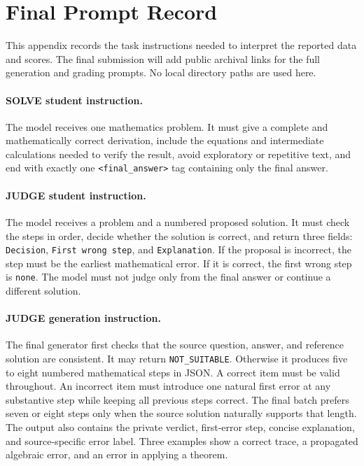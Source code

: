 \documentclass[11pt]{article}
\begin{document}
\clearpage
\section{Final Prompt Record}
\label{app:prompts}

This appendix records the task instructions needed to interpret the reported data and scores. The final submission will add public archival links for the full generation and grading prompts. No local directory paths are used here.

\paragraph{SOLVE student instruction.}
The model receives one mathematics problem. It must give a complete and mathematically correct derivation, include the equations and intermediate calculations needed to verify the result, avoid exploratory or repetitive text, and end with exactly one \texttt{<final\_answer>} tag containing only the final answer.

\paragraph{JUDGE student instruction.}
The model receives a problem and a numbered proposed solution. It must check the steps in order, decide whether the solution is correct, and return three fields: \texttt{Decision}, \texttt{First wrong step}, and \texttt{Explanation}. If the proposal is incorrect, the step must be the earliest mathematical error. If it is correct, the first wrong step is \texttt{none}. The model must not judge only from the final answer or continue a different solution.

\paragraph{JUDGE generation instruction.}
The final generator first checks that the source question, answer, and reference solution are consistent. It may return \texttt{NOT\_SUITABLE}. Otherwise it produces five to eight numbered mathematical steps in JSON. A correct item must be valid throughout. An incorrect item must introduce one natural first error at any substantive step while keeping all previous steps correct. The final batch prefers seven or eight steps only when the source solution naturally supports that length. The output also contains the private verdict, first-error step, concise explanation, and source-specific error label. Three examples show a correct trace, a propagated algebraic error, and an error in applying a theorem.
\end{document}
